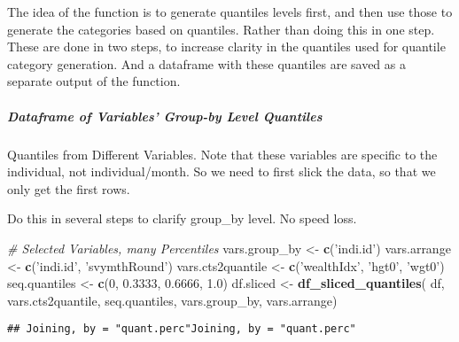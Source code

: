 \documentclass[
]{article}
\newenvironment{Shaded}{\begin{snugshade}}{\end{snugshade}}
\newcommand{\CommentTok}[1]{\textcolor[rgb]{0.56,0.35,0.01}{\textit{#1}}}
\newcommand{\DecValTok}[1]{\textcolor[rgb]{0.00,0.00,0.81}{#1}}
\newcommand{\FloatTok}[1]{\textcolor[rgb]{0.00,0.00,0.81}{#1}}
\newcommand{\KeywordTok}[1]{\textcolor[rgb]{0.13,0.29,0.53}{\textbf{#1}}}
\newcommand{\NormalTok}[1]{#1}
\newcommand{\OperatorTok}[1]{\textcolor[rgb]{0.81,0.36,0.00}{\textbf{#1}}}
\newcommand{\StringTok}[1]{\textcolor[rgb]{0.31,0.60,0.02}{#1}}
\begin{document}
The idea of the function is to generate quantiles levels first, and then
use those to generate the categories based on quantiles. Rather than
doing this in one step. These are done in two steps, to increase clarity
in the quantiles used for quantile category generation. And a dataframe
with these quantiles are saved as a separate output of the function.

\hypertarget{dataframe-of-variables-group-by-level-quantiles}{%
\subparagraph{Dataframe of Variables' Group-by Level
Quantiles}\label{dataframe-of-variables-group-by-level-quantiles}}

Quantiles from Different Variables. Note that these variables are
specific to the individual, not individual/month. So we need to first
slick the data, so that we only get the first rows.

Do this in several steps to clarify group\_by level. No speed loss.

\begin{Shaded}
\begin{Highlighting}[]
\CommentTok{# Selected Variables, many Percentiles}
\NormalTok{vars.group_by <-}\StringTok{ }\KeywordTok{c}\NormalTok{(}\StringTok{'indi.id'}\NormalTok{)}
\NormalTok{vars.arrange <-}\StringTok{ }\KeywordTok{c}\NormalTok{(}\StringTok{'indi.id'}\NormalTok{, }\StringTok{'svymthRound'}\NormalTok{)}
\NormalTok{vars.cts2quantile <-}\StringTok{ }\KeywordTok{c}\NormalTok{(}\StringTok{'wealthIdx'}\NormalTok{, }\StringTok{'hgt0'}\NormalTok{, }\StringTok{'wgt0'}\NormalTok{)}
\NormalTok{seq.quantiles <-}\StringTok{ }\KeywordTok{c}\NormalTok{(}\DecValTok{0}\NormalTok{, }\FloatTok{0.3333}\NormalTok{, }\FloatTok{0.6666}\NormalTok{, }\FloatTok{1.0}\NormalTok{)}
\NormalTok{df.sliced <-}\StringTok{ }\KeywordTok{df_sliced_quantiles}\NormalTok{(}
\NormalTok{  df, vars.cts2quantile, seq.quantiles, vars.group_by, vars.arrange)}
\end{Highlighting}
\end{Shaded}

\begin{verbatim}
## Joining, by = "quant.perc"Joining, by = "quant.perc"
\end{verbatim}

\begin{Shaded}
\end{Shaded}
\end{document}
